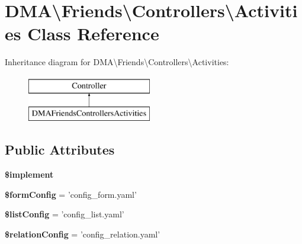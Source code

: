 \hypertarget{classDMA_1_1Friends_1_1Controllers_1_1Activities}{\section{D\+M\+A\textbackslash{}Friends\textbackslash{}Controllers\textbackslash{}Activities Class Reference}
\label{classDMA_1_1Friends_1_1Controllers_1_1Activities}
}
Inheritance diagram for D\+M\+A\textbackslash{}Friends\textbackslash{}Controllers\textbackslash{}Activities\+:\begin{figure}[H]
\begin{center}
\leavevmode
\includegraphics[height=2.000000cm]{d4/d37/classDMA_1_1Friends_1_1Controllers_1_1Activities}
\end{center}
\end{figure}
\subsection*{Public Attributes}
\begin{DoxyCompactItemize}
\item 
{\bfseries \$implement}
\item 
\hypertarget{classDMA_1_1Friends_1_1Controllers_1_1Activities_a05bd364a981c519d8288a80a0bf816d7}{{\bfseries \$form\+Config} = 'config\+\_\+form.\+yaml'}\label{classDMA_1_1Friends_1_1Controllers_1_1Activities_a05bd364a981c519d8288a80a0bf816d7}

\item 
\hypertarget{classDMA_1_1Friends_1_1Controllers_1_1Activities_ac9c246da820ff83a1c0ffe831421d26f}{{\bfseries \$list\+Config} = 'config\+\_\+list.\+yaml'}\label{classDMA_1_1Friends_1_1Controllers_1_1Activities_ac9c246da820ff83a1c0ffe831421d26f}

\item 
\hypertarget{classDMA_1_1Friends_1_1Controllers_1_1Activities_a816d7d22813eaf0145186ec3ea447bf0}{{\bfseries \$relation\+Config} = 'config\+\_\+relation.\+yaml'}\label{classDMA_1_1Friends_1_1Controllers_1_1Activities_a816d7d22813eaf0145186ec3ea447bf0}

\end{DoxyCompactItemize}


